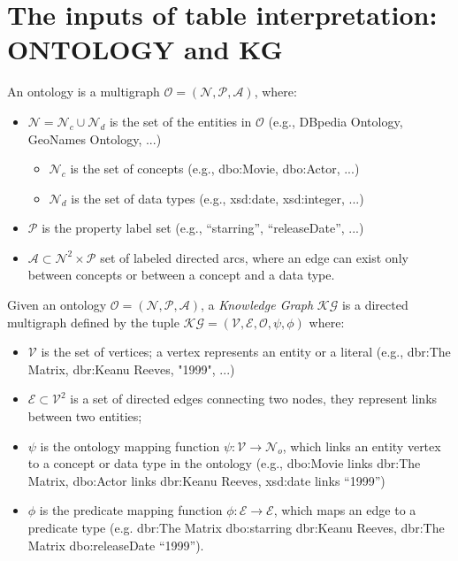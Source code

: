 \documentclass{llncs}
\begin{document}
\section{The inputs of table interpretation: ONTOLOGY and KG}
\begin{definition}
      An ontology is a multigraph
      $\mathcal{O}=(\mathcal{N}, \mathcal{P}, \mathcal{A})$, where:
      \begin{itemize}
            \item $\mathcal{N} =\mathcal{N}_c \cup \mathcal{N}_d$ is the set of the entities in $\mathcal{O}$ (e.g., {DBpedia Ontology, GeoNames Ontology, ...})
                  \begin{itemize}
                        \item $\mathcal{N}_c$ is the set of concepts (e.g., {dbo:Movie, dbo:Actor, ...})
                        \item $\mathcal{N}_d$ is the set of data types (e.g., {xsd:date, xsd:integer, ...})
                  \end{itemize}
            \item $\mathcal{P}$ is the property label set (e.g., {“starring”, “releaseDate”, ...})
            \item $\mathcal{A} \subset \mathcal{N}^2\times\mathcal{P}$ set of labeled directed arcs, where an edge can exist only between concepts or between a concept and a data type.
      \end{itemize}
\end{definition}

\begin{definition} 
      Given an ontology $\mathcal{O}=(\mathcal{N},\mathcal{P}, \mathcal{A})$,
      a \textit{Knowledge Graph} $\mathcal{KG}$ \cite{SHI2016123} is a directed multigraph defined by the tuple
      $\mathcal{KG}=(\mathcal{V, E, O}, \psi, \phi)$ where:
      \begin{itemize}
            \item $\mathcal{V}$ is the set of vertices; a vertex represents an entity or a literal (e.g., {dbr:The Matrix, dbr:Keanu Reeves, "1999", ...})
            \item $\mathcal{E} \subset \mathcal{V}^2$ is a set of directed edges connecting two nodes, they represent links between two entities;
            \item $\psi$ is the ontology mapping function $\psi:\mathcal{V}\to \mathcal{N}_o$, which links an entity vertex to a concept or data type in the ontology (e.g., dbo:Movie links dbr:The Matrix, dbo:Actor links dbr:Keanu Reeves, xsd:date links “1999”)
            \item $\phi$ is the predicate mapping function $\phi:\mathcal{E} \to \mathcal{E}$, which maps an edge to a predicate type (e.g. dbr:The Matrix dbo:starring dbr:Keanu Reeves, dbr:The Matrix dbo:releaseDate “1999”).
      \end{itemize}
\end{definition}
\end{document}
